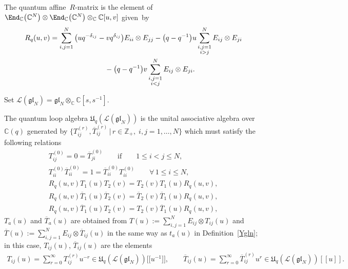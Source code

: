 \begin{definition}
The quantum af\/f\/ine~$R$-matrix is the element of $\End_{\mathbb{C}}\big(\mathbb{C}^N\big) \otimes
\End_{\mathbb{C}}\big(\mathbb{C}^N\big) \otimes_{\mathbb{C}} \mathbb{C}[u,v]$ given~by
\begin{gather*}
R_q(u,v) = \sum\limits_{i,j=1}^N \big(uq^{-\delta_{ij}} - vq^{\delta_{ij}}\big) E_{ii} \otimes E_{jj} - \big(q-q^{-1}\big)u
\sum\limits_{\substack{i,j=1\\ i > j}}^N E_{ij} \otimes E_{ji}\\
\hphantom{R_q(u,v) =}{}
- \big(q-q^{-1}\big)v \sum\limits_{\substack{i,j=1\\ i < j}}^N E_{ij} \otimes E_{ji}.
\end{gather*}
\end{definition}
Set $\mathcal{L}(\mathfrak{gl}_N)=\mathfrak{gl}_N \otimes_{\mathbb{C}} \mathbb{C}[s,s^{-1}]$.
\begin{definition}
The quantum loop algebra $\mathfrak{U}_q(\mathcal{L}(\mathfrak{gl}_N))$ is the unital associative algebra
over~$\mathbb{C}(q)$ generated by $\{T_{ij}^{(r)},\overline{T}_{ij}^{(r)} \,|\, r\in\mathbb{Z}_+, \; i,j=1,\ldots,N\}$
which must satisfy the following relations
\begin{gather}
T_{ij}^{(0)} = 0 = \overline{T}_{ji}^{(0)} \qquad \text{if} \qquad  1 \leq i<j \leq N,
\nonumber
\\
T_{ii}^{(0)} \overline{T}_{ii}^{(0)} = 1 = \overline{T}_{ii}^{(0)} T_{ii}^{(0)} \qquad \forall\,   1 \leq i \leq N,
\nonumber
\\
R_q(u,v)T_1(u)T_2(v) = T_2(v) T_1(u) R_q(u,v),
\label{RTTql1}
\\
R_q(u,v)\overline{T}_1(u)\overline{T}_2(v) = \overline{T}_2(v) \overline{T}_1(u) R_q(u,v),
\label{RTTql2}
\\
R_q(u,v)\overline{T}_1(u) T_2(v) = T_2(v) \overline{T}_1(u) R_q(u,v),
\label{RTTql3}
\end{gather}
$T_a(u)$ and $\overline{T}_a(u)$ are obtained from $T(u):=\sum\limits_{i,j=1}^N{E_{ij} \otimes T_{ij}(u)}$ and
$\overline{T}(u):=\sum\limits_{i,j=1}^N{E_{ij} \otimes \overline{T}_{ij}(u)}$ in the same way as $t_a(u)$ in
Def\/inition~\ref{Ygln}; in this case, $T_{ij}(u)$, $\overline{T}_{ij}(u)$ are the elements
\begin{gather*}
T_{ij}(u)=\sum\limits_{r=0}^\infty{T_{ij}^{(r)}u^{-r}} \in
\mathfrak{U}_q(\mathcal{L}(\mathfrak{gl}_N))\big[\big[u^{-1}\big]\big],
\qquad
\overline{T}_{ij}(u)=\sum\limits_{r=0}^\infty{\overline{T}_{ij}^{(r)}u^{r}} \in
\mathfrak{U}_q(\mathcal{L}(\mathfrak{gl}_N))[[u]].
\end{gather*}
\end{definition}

